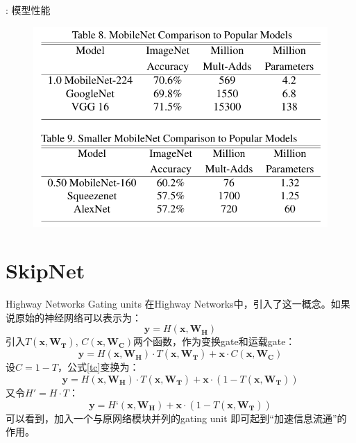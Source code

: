 \documentclass[UTF8, fontset=founder, aspectratio=43, 10pt, t]{ctexbeamer}
\begin{document}
\begin{frame}{\titleprefix: 模型性能}
\begin{figure}
	\centering
	\includegraphics[width=0.8\linewidth]{Images/mobilenetpf}
	\label{fig:mobilenetpf}
\end{figure}
\end{frame}

\section{SkipNet}

\begin{frame}{Highway Networks}
	\alert{Gating units} 在Highway Networks中，引入了这一概念。如果说原始的神经网络可以表示为：
	\begin{equation}
	\mathbf{y}=H\left(\mathbf{x}, \mathbf{W}_{\mathbf{H}}\right)
	\end{equation}
	引入$T\left(\mathbf{x}, \mathbf{W}_{\mathbf{T}}\right)$, $C\left(\mathbf{x}, \mathbf{W}_{\mathbf{C}}\right)$两个函数，作为变换gate和运载gate：
	\begin{equation}
	\label{tc}
	\mathbf{y}=H\left(\mathbf{x}, \mathbf{W}_{\mathbf{H}}\right) \cdot T\left(\mathbf{x}, \mathbf{W}_{\mathbf{T}}\right)+\mathbf{x} \cdot C\left(\mathbf{x}, \mathbf{W}_{\mathbf{C}}\right)
	\end{equation}
	设$C=1-T$，公式\eqref{tc}变换为：
	\begin{equation}
	\mathbf{y}=H\left(\mathbf{x}, \mathbf{W}_{\mathbf{H}}\right) \cdot T\left(\mathbf{x}, \mathbf{W}_{\mathbf{T}}\right)+\mathbf{x} \cdot\left(1-T\left(\mathbf{x}, \mathbf{W}_{\mathbf{T}}\right)\right)
	\end{equation}
	又令$H'=H\cdot T$：
	\begin{equation}
	\mathbf{y}=H‘\left(\mathbf{x}, \mathbf{W}_{\mathbf{H}}\right)+\mathbf{x} \cdot\left(1-T\left(\mathbf{x}, \mathbf{W}_{\mathbf{T}}\right)\right)
	\end{equation}
	可以看到，加入一个与原网络模块并列的gating unit 即可起到“加速信息流通”的作用。
	
\end{frame}
\end{document}
